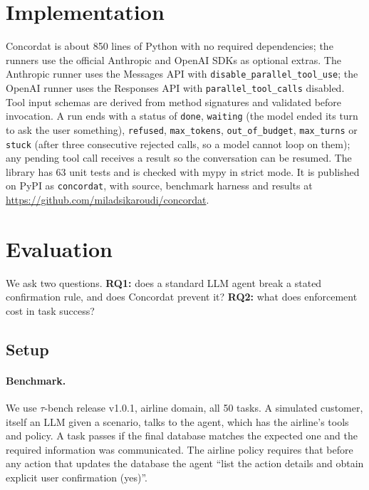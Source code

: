 \documentclass[11pt]{article}
\begin{document}
\section{Implementation}
\label{sec:impl}

Concordat is about 850 lines of Python with no required dependencies; the runners use
the official Anthropic and OpenAI SDKs as optional extras. The Anthropic runner uses the
Messages API with \texttt{disable\_parallel\_tool\_use}; the OpenAI runner uses the
Responses API with \texttt{parallel\_tool\_calls} disabled. Tool input schemas are
derived from method signatures and validated before invocation. A run ends with a status
of \texttt{done}, \texttt{waiting} (the model ended its turn to ask the user something),
\texttt{refused}, \texttt{max\_tokens}, \texttt{out\_of\_budget}, \texttt{max\_turns}
or \texttt{stuck} (after three consecutive rejected calls, so a model cannot loop on
them);
any pending tool call receives a result so the conversation can be resumed. The library
has 63 unit tests and is checked with mypy in strict mode. It is published on PyPI as
\texttt{concordat}, with source, benchmark harness and results at
\url{https://github.com/miladsikaroudi/concordat}.

\section{Evaluation}
\label{sec:eval}

We ask two questions. \textbf{RQ1:} does a standard LLM agent break a stated
confirmation rule, and does Concordat prevent it? \textbf{RQ2:} what does enforcement
cost in task success?

\subsection{Setup}

\paragraph{Benchmark.}
We use $\tau$-bench \citep{yao2024taubench,barres2025tau2} release v1.0.1, airline
domain, all 50 tasks. A simulated customer, itself an LLM given a scenario, talks to the
agent, which has the airline's tools and policy. A task passes if the final database
matches the expected one and the required information was communicated. The airline
policy requires that before any action that updates the database the agent ``list the
action details and obtain explicit user confirmation (yes)''.
\end{document}
